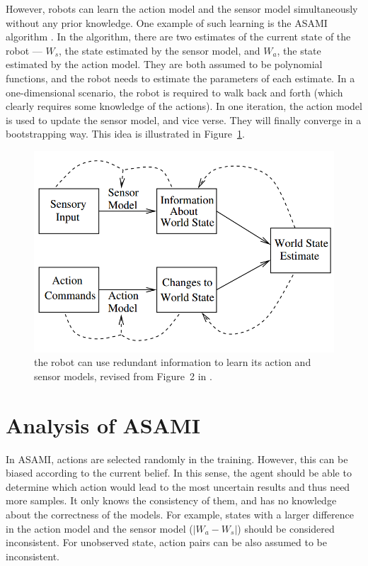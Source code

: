 \documentclass[12pt]{article}
\begin{document}
However, robots can learn the action model and the 	sensor model
simultaneously without any prior knowledge. One example of such
learning is the ASAMI
algorithm \cite{CSJ06}. In the algorithm, there are two estimates of the current state
of the robot --- $W_s$, the state estimated by the sensor model, and
$W_a$, the state estimated by the action model. They are both assumed
to be polynomial functions, and the robot needs to estimate the parameters
of each estimate. In a one-dimensional scenario, the robot is required
to walk back and forth (which clearly requires some knowledge of the
actions).  In one iteration, the action model is used to update the
sensor model, and vice verse. They will finally converge in a
bootstrapping way. This idea is illustrated in
Figure~\ref{fig:relation}.

\begin{figure}
\centering
\includegraphics[width=0.7\columnwidth]{relation.png}
\caption{the robot can use redundant information to learn its action
and sensor models, revised from Figure~2 in \cite{CSJ06}.}
\label{fig:relation}
\end{figure}

\section{Analysis of ASAMI}

In ASAMI, actions are selected randomly
in the training. However, this can be biased according to the current
belief.  In this sense, the agent should be able to determine which
action would lead to the most uncertain results and thus need more
samples.  It
only knows the consistency of them, and has no knowledge about the
correctness of the models. For example, states with a larger
difference in the action model and the sensor model ($|W_a - W_s|$) should be
considered inconsistent.  For unobserved state, action pairs can be
also assumed to be inconsistent.
\end{document}
